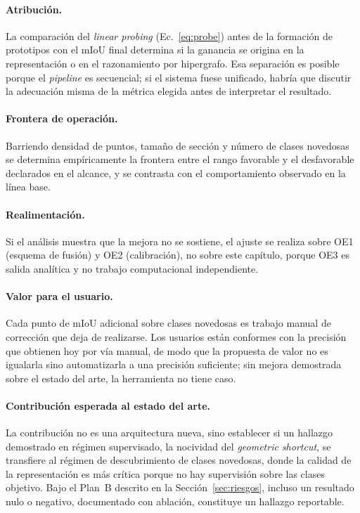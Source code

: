 \paragraph*{Atribución.} La comparación del \emph{linear probing}
(Ec.~\eqref{eq:probe}) antes de la formación de prototipos con el mIoU final
determina si la ganancia se origina en la representación o en el razonamiento por
hipergrafo. Esa separación es posible porque el \emph{pipeline} es secuencial; si
el sistema fuese unificado, habría que discutir la adecuación misma de la métrica
elegida antes de interpretar el resultado.

\paragraph*{Frontera de operación.} Barriendo densidad de puntos, tamaño de
sección y número de clases novedosas se determina empíricamente la frontera entre
el rango favorable y el desfavorable declarados en el alcance, y se contrasta con
el comportamiento observado en la línea base.

\paragraph*{Realimentación.} Si el análisis muestra que la mejora no se sostiene,
el ajuste se realiza sobre OE1 (esquema de fusión) y OE2 (calibración), no sobre
este capítulo, porque OE3 es salida analítica y no trabajo computacional independiente.

\paragraph*{Valor para el usuario.} Cada punto de mIoU adicional sobre clases
novedosas es trabajo manual de corrección que deja de realizarse. Los usuarios
están conformes con la precisión que obtienen hoy por vía manual, de modo que la
propuesta de valor no es igualarla sino automatizarla a una precisión suficiente;
sin mejora demostrada sobre el estado del arte, la herramienta no tiene caso.

\paragraph*{Contribución esperada al estado del arte.} La contribución no es una
arquitectura nueva, sino establecer si un hallazgo demostrado en régimen
supervisado, la nocividad del \emph{geometric shortcut}, se transfiere al
régimen de descubrimiento de clases novedosas, donde la calidad de la
representación es más crítica porque no hay supervisión sobre las clases
objetivo. Bajo el Plan~B descrito en la Sección~\ref{sec:riesgos}, incluso un
resultado nulo o negativo, documentado con ablación, constituye un hallazgo
reportable.
